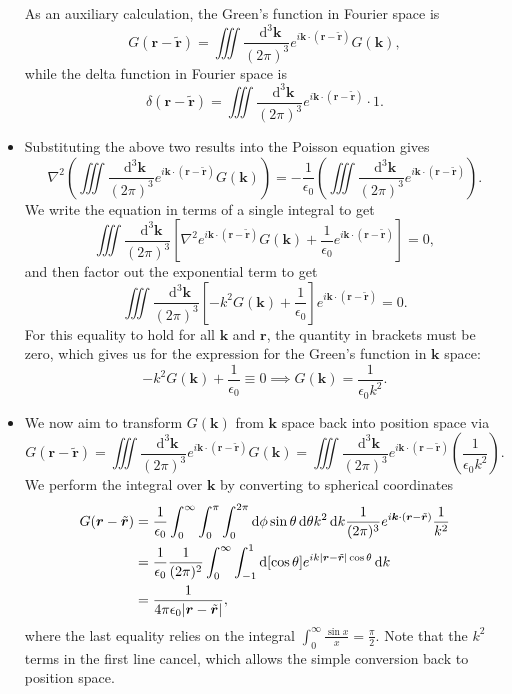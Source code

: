 \documentclass[11pt, a4paper]{article}
\newcommand{\diff}{\mathop{}\!\mathrm{d}} %
\newcommand{\dk}{\diff^{3} \vec{k}}  %
\renewcommand{\vec}[1]{\bm{#1}} %
\renewcommand{\t}[1]{\tilde{#1}} %
\renewcommand{\r}{\vec{r}}
\renewcommand{\k}{\vec{k}}
\newcommand{\ee}{\epsilon_{0}}  %
\renewcommand{\laplacian}{\nabla^{2}}
\begin{document}
\begin{itemize}
	As an auxiliary calculation, the Green's function in Fourier space is
	\begin{equation*}
		G(\r - \t{\r}) = \iiint \frac{\dk}{(2\pi)^{3}}e^{i\k \cdot (\r - \t{\r})}G(\k),
	\end{equation*}
	while the delta function in Fourier space is
	\begin{equation*}
		\delta(\r - \t{\r}) = \iiint \frac{\dk}{(2\pi)^{3}}e^{i\k \cdot (\r - \t{\r})}\cdot 1.
	\end{equation*}
	
    \item Substituting the above two results into the Poisson equation gives
	\begin{equation*}
		\laplacian \left(\iiint \frac{\dk}{(2\pi)^{3}} e^{i\k \cdot (\r - \t{\r})} G(\k)\right) = -\frac{1}{\ee} \left(\iiint \frac{\dk}{(2\pi)^{3}}e^{i\k \cdot (\r - \t{\r})} \right).
	\end{equation*}
	We write the equation in terms of a single integral to get
	\begin{equation*}
		\iiint \frac{\dk}{(2\pi)^{3}} \left[\laplacian e^{i\k \cdot (\r - \t{\r})}G(\k) + \frac{1}{\ee}e^{i\k \cdot (\r - \t{\r})}\right] = 0,
	\end{equation*}
	and then factor out the exponential term to get
	\begin{equation*}
		\iiint \frac{\dk}{(2\pi)^{3}} \left[-k^{2} G(\k) + \frac{1}{\ee}\right]e^{i\k \cdot (\r - \t{\r})} = 0.
	\end{equation*}
	For this equality to hold for all $ \k $ and $ \r $, the quantity in brackets must be zero, which gives us for the expression for the Green's function in $ \k $ space:
	\begin{equation*}
		-k^{2} G(\k) + \frac{1}{\ee} \equiv 0 \implies G(\k) = \frac{1}{\ee k^{2}}.
	\end{equation*}
	
	\item We now aim to transform $ G(\k) $ from $ \k $ space back into position space via
	\begin{equation*}
		G(\r - \t{\r}) = \iiint \frac{\dk}{(2\pi)^{3}}e^{i\k \cdot (\r - \t{\r})}G(\k) = \iiint \frac{\dk}{(2\pi)^{3}}e^{i\k \cdot (\r - \t{\r})}\left(\frac{1}{\ee k^{2}}\right).
	\end{equation*}
	We perform the integral over $ \k $ by converting to spherical coordinates
	\begin{align*}
		G(\r - \t{\r}) &= \frac{1}{\ee}\int_{0}^{\infty} \int_{0}^{\pi} \int_{0}^{2\pi} \diff \phi \sin \theta \diff \theta k^{2} \diff k \frac{1}{(2\pi)^{3}}e^{i\k \cdot (\r - \t{\r})} \frac{1}{k^{2}} \\
		& = \frac{1}{\ee}\frac{1}{(2\pi)^{2}}\int_{0}^{\infty} \int_{-1}^{1} \diff [\cos \theta]  e^{ik\abs{\r - \t{\r}}\cos \theta} \diff k\\
		& = \frac{1}{4\pi \ee \abs{\r - \t{\r}}},
	\end{align*}
	where the last equality relies on the integral $ \int_{0}^{\infty}\frac{\sin x}{x} = \frac{\pi}{2} $. Note that the $ k^{2} $ terms in the first line cancel, which allows the simple conversion back to position space.
	

\end{itemize}
\end{document}
